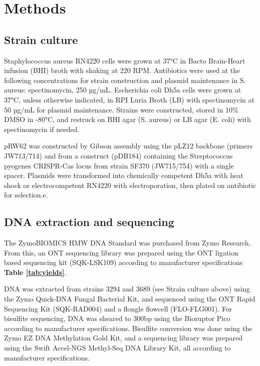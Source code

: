 \section{Methods}
\label{sec:methods}

\subsection{Strain culture}
\label{sec:methods}

Staphylococcus aureus RN4220 cells were grown at 37°C in Bacto Brain-Heart infusion (BHI) broth with shaking at 220 RPM. Antibiotics were used at the following concentrations for strain construction and plasmid maintenance in S. aureus: spectinomycin, 250 µg/mL. Escherichia coli Dh5a cells were grown at 37°C, unless otherwise indicated, in RPI Luria Broth (LB) with spectinomycin at 50 µg/mL for plasmid maintenance. Strains were constructed, stored in 10\% DMSO in -80°C, and restruck on BHI agar (S. aureus) or LB agar (E. coli) with spectinomycin if needed.

pRW62 was constructed by Gibson assembly using the pLZ12 backbone (primers JW713/714) and from a construct (pDB184) containing the Streptococcus pyogenes CRISPR-Cas locus from strain SF370 (JW715/754) with a single spacer. Plasmids were transformed into chemically competent Dh5a with heat shock or electrocompetent RN4220 with electroporation, then plated on antibiotic for selection.e.

\subsection{DNA extraction and sequencing}
\label{sec:methods}

The ZymoBIOMICS HMW DNA Standard was purchased from Zymo Research. From this, an ONT sequencing library was prepared using the ONT ligation based sequencing kit (SQK-LSK109) according to manufacturer specifications {\bf Table \ref{tab:yields}}.

DNA was extracted from strains 3294 and 3689 (see Strain culture above) using the Zymo Quick-DNA Fungal Bacterial Kit, and sequenced using the ONT Rapid Sequencing Kit (SQK-RAD004) and a flongle flowcell (FLO-FLG001). For bisulfite sequencing, DNA was sheared to 300bp using the Bioruptor Pico according to manufacturer specifications. Bisulfite conversion was done using the Zymo EZ DNA Methylation Gold Kit, and a sequencing library was prepared using the Swift Accel-NGS Methyl-Seq DNA Library Kit, all according to manufacturer specifications.

